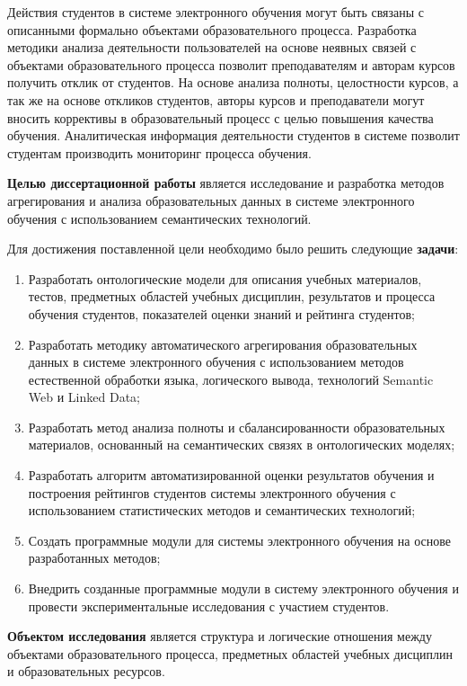 Действия студентов в системе электронного обучения могут быть связаны с описанными формально объектами образовательного процесса. Разработка методики анализа деятельности пользователей на основе неявных связей с объектами образовательного процесса позволит преподавателям и авторам курсов получить отклик от студентов. На основе анализа полноты, целостности курсов, а так же на основе откликов студентов, авторы курсов и преподаватели могут вносить коррективы в образовательный процесс с целью повышения качества обучения. Аналитическая информация деятельности студентов в системе позволит студентам производить мониторинг процесса обучения.     

\textbf{Целью диссертационной работы} является исследование и разработка методов агрегирования и анализа образовательных данных в системе электронного обучения с использованием семантических технологий.

Для достижения поставленной цели необходимо было решить следующие \textbf{задачи}:
\begin{enumerate}
 \item Разработать онтологические модели для описания учебных материалов, тестов, предметных областей учебных дисциплин, результатов и процесса обучения студентов, показателей оценки знаний и рейтинга студентов;
 \item Разработать методику автоматического агрегирования образовательных данных в системе электронного обучения с использованием методов естественной обработки языка, логического вывода, технологий Semantic Web и Linked Data;
 \item Разработать метод анализа полноты и сбалансированности образовательных материалов, основанный на семантических связях в онтологических моделях;
  \item Разработать алгоритм автоматизированной оценки результатов обучения и построения рейтингов студентов системы электронного обучения с использованием статистических методов и семантических технологий;
  \item Создать программные модули для системы электронного обучения на основе разработанных методов;
  \item Внедрить созданные программные модули в систему электронного обучения и провести экспериментальные исследования с участием студентов.  
 \end{enumerate}

\textbf{Объектом исследования} является структура и логические отношения между объектами образовательного процесса, предметных областей учебных дисциплин и образовательных ресурсов.  

